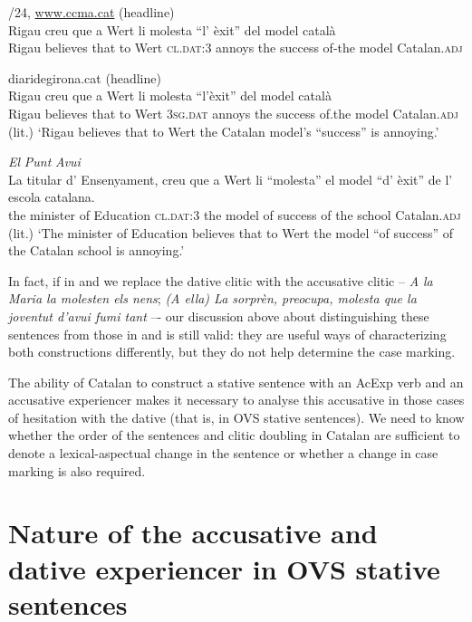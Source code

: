 \documentclass[output=paper,colorlinks,citecolor=brown,nonflat,modfonts]{langsci/langscibook}
\begin{document}
\ea%
 \label{ex:royo:7}
 /24, \url{www.ccma.cat} (headline)\\
 \gll Rigau creu que a Wert li molesta “l' èxit” del model català\\
 Rigau believes that to Wert \textsc{cl.dat:3} annoys the success of-the model Catalan.\textsc{adj}\\
 \glt {}
 
 \ex diaridegirona.cat (headline)\\
 \gll Rigau creu que a Wert li molesta “l’èxit” del model català\\
Rigau believes that to Wert \textsc{3sg.dat} annoys   the success of.the model Catalan.\textsc{adj} \\
 \glt (lit.) ‘Rigau believes that to Wert the Catalan model’s “success” is annoying.’
 
 \ex \emph{El} \emph{Punt} \emph{Avui}\\
 \gll La titular d’ Ensenyament, creu que a Wert li “molesta” el model “d’ èxit” de l’ escola catalana.\\
 the minister of Education \textsc{cl.dat:3} the model of success of the school Catalan.\textsc{adj}\\
 \glt (lit.) ‘The minister of Education believes that to Wert the model “of success” of the Catalan school
is annoying.’ 
 \z
 \z


In fact, if in  and  we replace the dative clitic with the accusative clitic – \textit{A la Maria la molesten els nens}; \textit{(A ella) La sorprèn, preocupa, molesta que la joventut d’avui fumi tant} –- our discussion above about distinguishing these sentences from those in  and  is still valid: they are useful ways of characterizing both constructions differently, but they do not help determine the case marking.

The ability of Catalan to construct a stative sentence with an AcExp verb and an accusative experiencer makes it necessary to analyse this accusative in those cases of hesitation with the dative (that is, in OVS stative sentences). We need to know whether the order of the sentences and clitic doubling in Catalan are sufficient to denote a lexical-aspectual change in the sentence or whether a change in case marking is also required.


\section{Nature of the accusative and dative experiencer in OVS stative sentences}\label{sec:royo:3}
\end{document}
